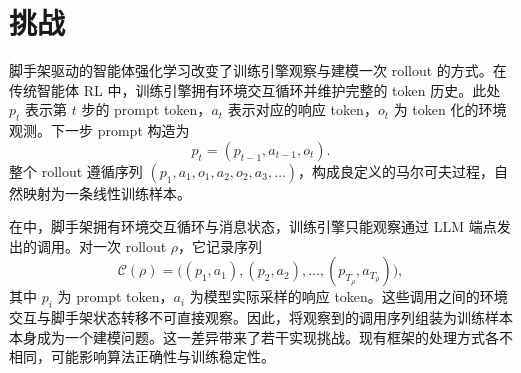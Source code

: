 \section{挑战}
\label{sec:challenges}

脚手架驱动的智能体强化学习改变了训练引擎观察与建模一次 rollout 的方式。在传统智能体 RL 中，训练引擎拥有环境交互循环并维护完整的 token 历史。此处 $p_t$ 表示第 $t$ 步的 prompt token，$a_t$ 表示对应的响应 token，$o_t$ 为 token 化的环境观测。下一步 prompt 构造为
\begin{equation}
  p_t = (p_{t-1},a_{t-1},o_t).
\end{equation}
整个 rollout 遵循序列 $(p_1,a_1,o_1,a_2,o_2,a_3,\ldots)$，构成良定义的马尔可夫过程，自然映射为一条线性训练样本。

在\add{\harl{}}中，脚手架拥有环境交互循环与消息状态，训练引擎只能观察通过 LLM 端点发出的调用。对一次 rollout $\rho$，它记录序列
\begin{equation}
  \mathcal{C}(\rho)
  = \bigl((p_1,a_1),(p_2,a_2),\ldots,(p_{T_\rho},a_{T_\rho})\bigr),
\end{equation}
其中 $p_i$ 为 prompt token，$a_i$ 为模型实际采样的响应 token。这些调用之间的环境交互与脚手架状态转移不可直接观察。因此，将观察到的调用序列组装为训练样本本身成为一个建模问题。这一差异带来了若干实现挑战。现有框架的处理方式各不相同，可能影响算法正确性与训练稳定性。


